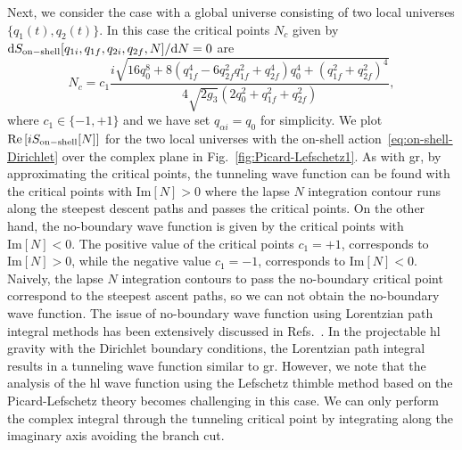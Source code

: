 \documentclass[superscriptaddress,aps,preprintnumbers,nofootinbib]{revtex4-2}
\begin{document}
Next, we consider the case with a global universe consisting of two local universes $\{q_{1}(t),q_{2}(t)\}$. In this case the critical points $N_c$ given by $\mathrm{d} S_{\rm on-shell} [q_{1 i},q_{1 f},q_{2 i},q_{2 f}, N]/\mathrm{d} N =0$ are
\begin{equation}\label{eq:Dirichlet-Dirichlet-saddle-points}
N_c=c_{1}\frac{i\sqrt{16q_0^8 +8(q_{1f}^4-6 q_{2f}^2 q_{1f}^2+q_{2f}^4) q_0^4+(q_{1f}^2+q_{2f}^2)^4}}{4 \sqrt{2g_3}(2 q_0^2+q_{1f}^2+q_{2f}^2)}, 
\end{equation}
where $c_{1} \in \{-1 , +1\}$ and we have set $q_{\alpha i}=q_0$ for simplicity. We plot $\textrm{Re}\left[iS_{\rm on-shell}[N]\right]$ for the two local universes with the on-shell action~\eqref{eq:on-shell-Dirichlet} over the complex plane in Fig.~\ref{fig:Picard-Lefschetz1}. As with \ac{gr}, by approximating the critical points, the tunneling wave function can be found with the critical points with $\textrm{Im}[N] > 0$ where the lapse $N$ integration contour runs along the steepest descent paths and passes the critical points. On the other hand, the no-boundary wave function is given by the critical points with $\textrm{Im}[N] < 0$. The positive value of the critical points $c_1=+1$, corresponds to $\textrm{Im}[N] > 0$, while the negative value $c_1=-1$, corresponds to $\textrm{Im}[N] < 0$. Naively, the lapse $N$ integration contours to pass the no-boundary critical point correspond to the steepest ascent paths, so we can not obtain the no-boundary wave function. The issue of no-boundary wave function using Lorentzian path integral methods has been extensively discussed in Refs.~\cite{Feldbrugge:2017kzv,DiazDorronsoro:2017hti}. In the projectable \ac{hl} gravity with the Dirichlet boundary conditions, the Lorentzian path integral results in a tunneling wave function similar to \ac{gr}. However, we note that the analysis of the \ac{hl} wave function using the Lefschetz thimble method based on the Picard-Lefschetz theory becomes challenging in this case. We can only perform the complex integral through the tunneling critical point by integrating along the imaginary axis avoiding the branch cut.
\end{document}
